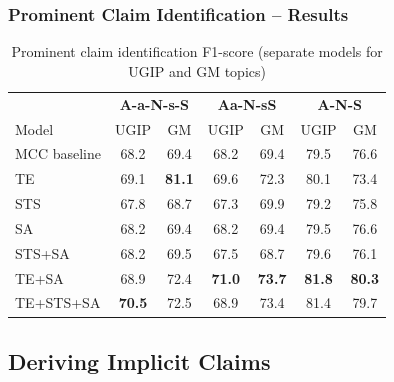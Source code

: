 \documentclass{beamer}
\begin{document}
\begin{frame}
	\frametitle{Prominent Claim Identification -- Results}
\begin{table}
\centering
{\small
\begin{tabular}{@{}l cc cc cc @{}}
\toprule
& 
\multicolumn{2}{c}{\textbf{A-a-N-s-S}} &
\multicolumn{2}{c}{\textbf{Aa-N-sS}} &
\multicolumn{2}{c}{\textbf{A-N-S}} \\
\cmidrule(lr){2-3}
\cmidrule(lr){4-5}
\cmidrule(lr){6-7}
Model & UGIP & GM & UGIP & GM & UGIP & GM \\ 
\midrule
MCC baseline  & 68.2 & 69.4 & 68.2 & 69.4  & 79.5 & 76.6        \\
TE            & 69.1 & \textbf{81.1} & 69.6 & 72.3 & 80.1 & 73.4        \\
STS           & 67.8 & 68.7 & 67.3 & 69.9 & 79.2 & 75.8        \\
SA            & 68.2 & 69.4 & 68.2 & 69.4 & 79.5 & 76.6        \\[1ex]
STS+SA        & 68.2 & 69.5 & 67.5 & 68.7 & 79.6 & 76.1         \\
TE+SA         & 68.9 & 72.4 & \textbf{71.0} & \textbf{73.7} & \textbf{81.8} & \textbf{80.3}    \\[1ex]
TE+STS+SA   & \textbf{70.5} & 72.5 & 68.9 & 73.4 & 81.4 & 79.7        \\
\bottomrule
\end{tabular}}
\caption{Prominent claim identification F1-score (separate models for UGIP and GM topics)}
\label{tab:claim_identification_results}
\end{table}

\end{frame}

\subsection{Deriving Implicit Claims}
\end{document}
